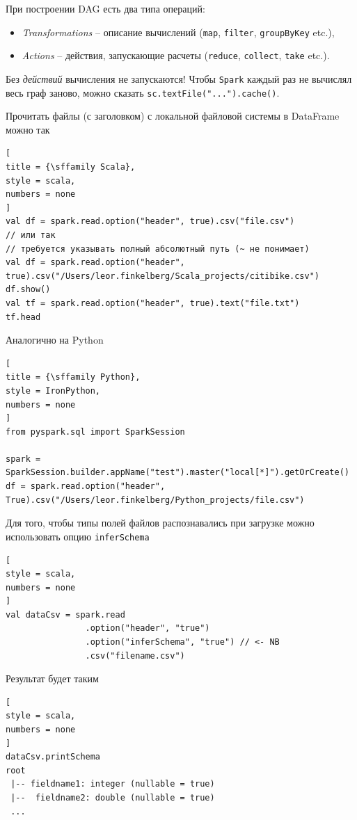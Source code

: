 \documentclass[%
	11pt,
	a4paper,
	utf8,
		]{article}
\begin{document}
При построении DAG есть два типа операций:
\begin{itemize}
	\item \emph{Transformations} -- описание вычислений (\texttt{map}, \texttt{filter}, \texttt{groupByKey} etc.),
	
	\item \emph{Actions} -- действия, запускающие расчеты (\texttt{reduce}, \texttt{collect}, \texttt{take} etc.).
\end{itemize}

Без \emph{действий} вычисления не запускаются! Чтобы \texttt{Spark} каждый раз не вычислял весь граф заново, можно сказать \texttt{sc.textFile("...").cache()}.

Прочитать файлы (с заголовком) с локальной файловой системы в DataFrame можно так
\begin{lstlisting}[
title = {\sffamily Scala},
style = scala,
numbers = none	
]
val df = spark.read.option("header", true).csv("file.csv")
// или так
// требуется указывать полный абсолютный путь (~ не понимает)
val df = spark.read.option("header", true).csv("/Users/leor.finkelberg/Scala_projects/citibike.csv")
df.show()
val tf = spark.read.option("header", true).text("file.txt")
tf.head
\end{lstlisting}

Аналогично на Python
\begin{lstlisting}[
title = {\sffamily Python},
style = IronPython,
numbers = none	
]
from pyspark.sql import SparkSession

spark = SparkSession.builder.appName("test").master("local[*]").getOrCreate()
df = spark.read.option("header", True).csv("/Users/leor.finkelberg/Python_projects/file.csv")
\end{lstlisting}

Для того, чтобы типы полей файлов распознавались при загрузке можно использовать опцию \texttt{inferSchema}
\begin{lstlisting}[
style = scala,
numbers = none	
]
val dataCsv = spark.read
                .option("header", "true")
                .option("inferSchema", "true") // <- NB
                .csv("filename.csv")
\end{lstlisting}

Результат будет таким
\begin{lstlisting}[
style = scala,
numbers = none	
]
dataCsv.printSchema
root
 |-- fieldname1: integer (nullable = true)
 |--  fieldname2: double (nullable = true)
 ...
\end{lstlisting}
\end{document}
